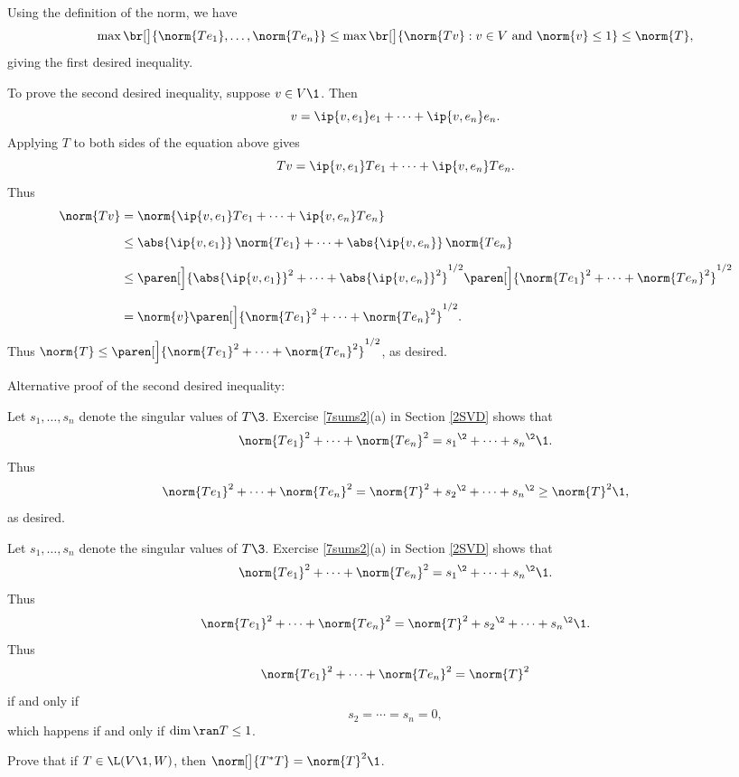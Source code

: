 \begin{Solution}
\begin{subtheorem}
\item
Using the definition of the norm, we have
\[
\max\br[\big]{ \norm{Te_1}, \ldots, \norm{Te_n} } \le \max\br[\big]{\norm{Tv}: v \in V \text{ and } \norm{v} \le 1} \le \norm{T},
\]
giving the first desired inequality.

To prove the second desired inequality, suppose $v \in V\1$. Then
\[
v = \ip{v,e_1} e_1 + \cdots + \ip{v, e_n} e_n.
\]
Applying $T$ to both sides of the equation above gives
\[
Tv = \ip{v,e_1} Te_1 + \cdots + \ip{v, e_n} Te_n.
\]
Thus
\begin{align*}
\norm{Tv} &= \norm{ \ip{v,e_1} Te_1 + \cdots + \ip{v, e_n} Te_n } \\[6bp]
&\le \abs{\ip{v, e_1}} \, \norm{Te_1} + \cdots + \abs{\ip{v, e_n}} \, \norm{Te_n} \\[6bp]
&\le \paren[\Big]{ \abs{\ip{v, e_1}}^2 + \cdots + \abs{\ip{v, e_n}}^2}^{1/2}
      \paren[\Big]{ \norm{Te_1}^2 + \cdots + \norm{Te_n}^2 }^{1/2}\\[6bp]
&= \norm{v} \paren[\Big]{ \norm{Te_1}^2 + \cdots + \norm{Te_n}^2 }^{1/2}.
\end{align*}
Thus $\norm{T} \le \paren[\Big]{ \norm{Te_1}^2 + \cdots + \norm{Te_n}^2 }^{1/2}$, as desired.

Alternative proof of the second desired inequality:

Let $s_1, \ldots, s_n$ denote the singular values of $T\3$. Exercise \ref{7sums2}(a) in Section \ref{2SVD} shows that
\[
\norm{Te_1}^2 + \cdots + \norm{Te_n}^2 = {s_1}^{\2} + \cdots + {s_n}^{\2}\1.
\]
Thus
\[
\norm{Te_1}^2 + \cdots + \norm{Te_n}^2 = \norm{T}^2 +{s_2}^{\2} + \cdots + {s_n}^{\2} \ge \norm{T}^2\1,
\]
as desired.

\item
Let $s_1, \ldots, s_n$ denote the singular values of $T\3$. Exercise \ref{7sums2}(a) in Section \ref{2SVD} shows that
\[
\norm{Te_1}^2 + \cdots + \norm{Te_n}^2 = {s_1}^{\2} + \cdots + {s_n}^{\2}\1.
\]
Thus
\[
\norm{Te_1}^2 + \cdots + \norm{Te_n}^2 = \norm{T}^2 +{s_2}^{\2} + \cdots + {s_n}^{\2}\1.
\]
Thus
\[
\norm{Te_1}^2 + \cdots + \norm{Te_n}^2 = \norm{T}^2
\]
if and only if
\[
s_2 = \cdots = s_n = 0,
\]
which happens if and only if $\dim \ran T \le 1$.
\end{subtheorem}
\end{Solution}

\exercise
Prove that if $T \in \L(V\1, W)$, then  $\norm[\big]{T^*T} = \norm{T}^2\1$.\label{8Cstar}

